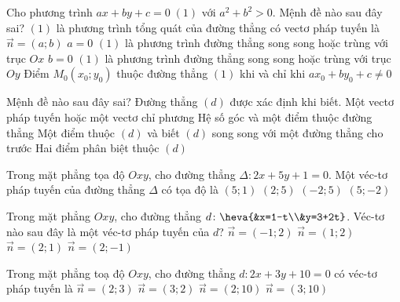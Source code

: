 \begin{ex}%
	Cho phương trình $ax+by+c=0\; (1)$ với $a^2+b^2> 0$. Mệnh đề nào sau đây  sai?
	\choice 
		{$(1)$ là phương trình tổng quát của đường  thẳng có vectơ pháp tuyến là $\overrightarrow{n}=\left(a;b\right)$}
		{$a=0$ $(1)$ là  phương trình đường thẳng song song hoặc trùng với trục $Ox$}
		{$b=0$ $(1)$ là phương trình đường thẳng song song hoặc trùng với trục  $Oy$}
		{\True Điểm $M_0 \left(x_0;y_0 \right)$ thuộc đường thẳng $(1)$ khi  và chỉ khi $ax_0+by_0+c\ne 0$}
\end{ex}

\begin{ex}%
	Mệnh đề nào sau đây sai? Đường thẳng $(d)$ được xác định khi  biết.
	 \choice
		{\True  Một vectơ pháp tuyến hoặc một vectơ chỉ phương}
		{Hệ  số góc và một điểm thuộc đường thẳng}
		{Một điểm thuộc $(d)$ và biết $(d)$  song song với một đường thẳng cho trước}
		{Hai  điểm phân biệt thuộc $(d)$}
\end{ex}

\begin{ex}%
	Trong mặt phẳng  tọa độ $Oxy$, cho đường thẳng $\Delta \colon 2x+5y+1=0$. Một véc-tơ pháp tuyến của đường thẳng $\Delta$ có tọa độ là
	\choice 
		 {$(5;1)$}
		 {\True $(2;5)$}
		 {$(-2;5)$}
		 {$(5;-2)$}
\end{ex}

\begin{ex}%
	Trong mặt phẳng $Oxy$, cho đường thẳng $d\colon  \heva{&x=1-t\\&y=3+2t}$. Véc-tơ nào sau đây là một véc-tơ pháp tuyến của $d$?
	\choice 
		{$\overrightarrow{n}=(-1;2)$} 
		{$\overrightarrow{n}=(1;2)$} 
		{\True $\overrightarrow{n}=(2;1)$} 
		{$\overrightarrow{n}=(2;-1)$} 
\end{ex}

\begin{ex}%
	Trong mặt phẳng toạ độ $Oxy$, cho đường thẳng $d\colon  2x+3y+10=0$ có véc-tơ pháp tuyến là
	\choice 
		{\True  $\overrightarrow{n}=\left( 2;3 \right)$}
		{$\overrightarrow{n}=\left(  3;2 \right)$}
		 {$\overrightarrow{n}=\left( 2;10 \right)$}
		 {$\overrightarrow{n}=\left( 3;10 \right)$}
\end{ex}

